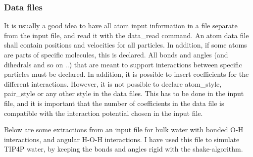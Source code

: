 \subsubsection{Data files}
It is usually a good idea to have all atom input information in a file separate from the input file, and read it with the data\_read command. An atom data file shall contain positions and velocities for all particles. In addition, if some atoms are parts of specific molecules, this is declared. All bonds and angles (and dihedrals and so on ..) that are meant to support interactions between specific particles must be declared. In addition, it is possible to insert coefficients for the different interactions. However, it is not possible to declare atom\_style, pair\_style or any other style in the data files. This has to be done in the input file, and it is important that the number of coefficients in the data file is compatible with the interaction potential chosen in the input file. 

Below are some extractions from an input file for bulk water with bonded O-H interactions, and angular H-O-H interactions. I have used this file to simulate TIP4P water, by keeping the bonds and angles rigid with the shake-algorithm. 

